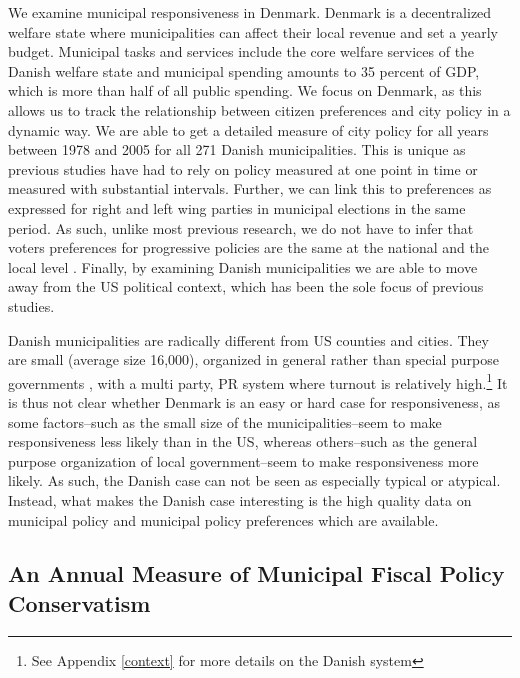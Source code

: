 \documentclass[a4paper,12pt]{article}
\begin{document}
 We examine municipal responsiveness in Denmark. Denmark is a decentralized welfare state where municipalities can affect their local revenue and set a yearly budget.  Municipal tasks and services include the core welfare services of the Danish welfare state and municipal spending amounts to 35 percent of GDP, which is more than half of all public spending. We focus on Denmark, as this allows us to track the relationship between citizen preferences and city policy in a dynamic way. We are able to get a detailed measure of city policy for all years between 1978 and 2005 for all 271 Danish municipalities. This is unique as previous studies have had to rely on policy measured at one point in time \citep{tausanovitch2014representation,palus2010responsiveness} or measured with substantial intervals\citep{sances2017voters,einstein2016pushing,hajnal2010or}. Further, we can link this to preferences as expressed for right and left wing parties in municipal elections in the same period. As such, unlike most previous research, we do not have to infer that voters preferences for progressive policies are the same at the national and the local level \citep[for an exception, see][]{tausanovitch2014representation}. Finally, by examining Danish municipalities we are able to move away from the US political context, which has been the sole focus of previous studies. 
 
Danish municipalities are radically different from US counties and cities. They are small (average size 16,000), organized in general rather than special purpose governments \citep{berry2009imperfect}, with a multi party, PR system where turnout is relatively high.\footnote{See Appendix \ref{context} for more details on the Danish system} It is thus not clear whether Denmark is an easy or hard case for responsiveness, as some factors--such as the small size of the municipalities--seem to make responsiveness less likely than in the US, whereas others--such as the general purpose organization of local government--seem to make responsiveness more likely. As such, the Danish case can not be seen as especially typical or atypical. Instead, what makes the Danish case interesting is the high quality data on municipal policy and municipal policy preferences which are available.


\subsection*{An Annual Measure of Municipal Fiscal Policy Conservatism}
\end{document}
